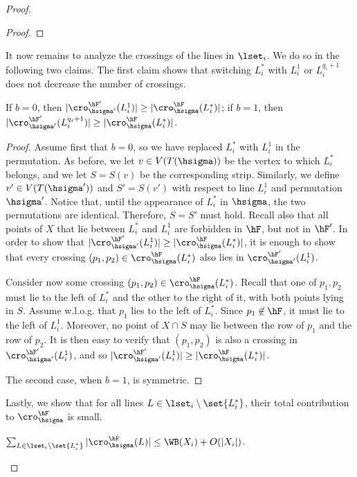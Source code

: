 \documentclass{toc}
\begin{document}
\begin{proof}
\begin{proof}
	\end{proof}
	
	It now remains to analyze the crossings of the lines in $\lset_i$. We do so in the following two claims. The first claim shows that switching $L^*_i$ with $L^1_i$ or $L^{q_i+1}_i$ does not decrease the number of crossings.
	
	\begin{claim}
		If $b=0$, then	$|\cro^{\hF'}_{\hsigma'}(L_i^1)|\geq |\cro^{\hF}_{\hsigma}(L^*_i)|$; if $b=1$, then $|\cro^{\hF'}_{\hsigma'}(L_i^{q_i+1})|\geq |\cro^{\hF}_{\hsigma}(L^*_i)|$.
	\end{claim}
	
	\begin{proof}
		Assume first that $b=0$, so we have replaced $L^*_i$ with $L_i^1$ in the permutation. As before, we let $v\in V(T({\hsigma}))$ be the vertex to which $L^*_i$ belongs, and we let $S=S(v)$ be the corresponding strip. Similarly, we define $v'\in V(T({\hsigma'}))$ and $S'=S(v')$ with respect to line $L_i^1$ and permutation $\hsigma'$. Notice that, until the appearance of $L^*_i$ in $\hsigma$, the two permutations are identical. Therefore, $S=S'$ must hold. Recall also that all points of $X$ that lie between $L^*_i$ and $L_i^1$ are forbidden in $\hF$, but not in $\hF'$. In order to show that $|\cro^{\hF'}_{\hsigma'}(L_i^1)|\geq |\cro^{\hF}_{\hsigma}(L^*_i)|$, it is enough to show that every crossing $(p_1,p_2)\in \cro^{\hF}_{\hsigma}(L^*_i)$ also lies in $\cro^{\hF'}_{\hsigma'}(L_i^1)$. 
		
		Consider now some crossing $(p_1,p_2)\in \cro^{\hF}_{\hsigma}(L^*_i)$. Recall that one of $p_1,p_2$ must lie to the left of $L_i^*$ and the other to the right of it, with both points lying in $S$. Assume w.l.o.g. that $p_1$ lies to the left of $L_i^*$. Since $p_1\not\in \hF$, it must lie to the left of $L^1_i$. Moreover, no point of $X\cap S$ may lie between the row of $p_1$ and the row of $p_2$. It is then easy to verify that $(p_1,p_2)$ is also a crossing in $\cro^{\hF'}_{\hsigma'}(L_i^1)$, and so $|\cro^{\hF'}_{\hsigma'}(L_i^1)|\geq |\cro^{\hF}_{\hsigma}(L^*_i)|$.
		
		The second case, when $b=1$, is symmetric.
	\end{proof}
	
	Lastly, we show that for all lines $L\in \lset_i\setminus\set{L_i^*}$, their total contribution to $\cro^{\hF}_{\hsigma}$ is small. 
	
	\begin{claim}\label{claim: lines in li contribute little}
		$\sum_{L\in \lset_i\setminus\set{L_i^*}}|\cro^{\hF}_{\hsigma}(L)|\leq \WB(X_i)+O(|X_i|)$.
	\end{claim}
	

\end{proof}
\end{document}
